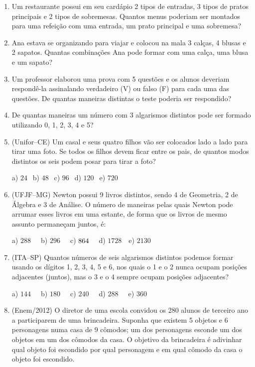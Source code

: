 \begin{multicols*}{2}
\begin{enumerate}
	\item Um restaurante possui em seu cardápio 2 tipos de entradas, 3 tipos de pratos principais e 2 tipos de sobremesas. Quantos menus poderiam ser montados para uma refeição com uma entrada, um prato principal e uma sobremesa?
	
	\item Ana estava se organizando para viajar e colocou na mala 3 calças, 4 blusas e 2 sapatos. Quantas combinações Ana pode formar com uma calça, uma blusa e um sapato?
	
	\item Um professor elaborou uma prova com 5 questões e os alunos deveriam respondê-la assinalando verdadeiro (V) ou falso (F) para cada uma das questões. De quantas maneiras distintas o teste poderia ser respondido?
	
	\item De quantas maneiras um número com 3 algarismos distintos pode ser formado utilizando 0, 1, 2, 3, 4 e 5?
	
	\item (Unifor–CE) Um casal e seus quatro filhos vão ser colocados lado a lado para tirar uma foto. Se todos os filhos devem ficar entre os pais, de quantos modos distintos os seis podem posar para tirar a foto?

	a) $24 \ \ $ b) $48 \ \ $ c) $96 \ \ $ d) $120 \ \ $ e) $720 \ \ $

	\item (UFJF–MG) Newton possui 9 livros distintos, sendo 4 de Geometria, 2 de Álgebra e 3 de Análise. O número de maneiras pelas quais Newton pode arrumar esses livros em uma estante, de forma que os livros de mesmo assunto permaneçam juntos, é:
	
	a) $288 \ \ \ \ \ $ b) $296 \ \ \ \ \ $ c) $864 \ \ \ \ \\ $ d) $1728 \ \ \ $ e) $2130 \ \ $

	\item (ITA–SP) Quantos números de seis algarismos distintos podemos formar usando os dígitos 1, 2, 3, 4, 5 e 6, nos quais o 1 e o 2 nunca ocupam posições adjacentes (juntos), mas o 3 e o 4 sempre ocupam posições adjacentes? 

	a) $144 \ \ \ \ \ $ b) $180 \ \ \ \ \ $ c) $240 \ \ \ \ \ $ d) $288 \ \ \ \ \ $ e) $360 \ \ $

	\item (Enem/2012) O diretor de uma escola convidou os 280 alunos de terceiro ano a participarem de uma brincadeira. Suponha que existem 5 objetos e 6 personagens numa casa de 9 cômodos; um dos personagens esconde um dos objetos em um dos cômodos da casa. O objetivo da brincadeira é adivinhar qual objeto foi escondido por qual personagem e em qual cômodo da casa o objeto foi escondido.
	

\end{enumerate}
\end{multicols*}
